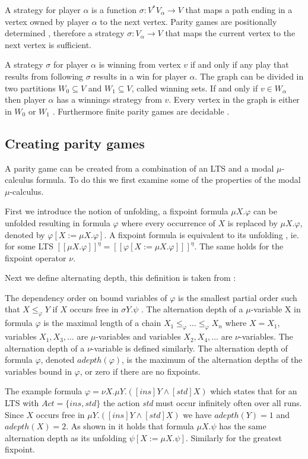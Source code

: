 A strategy for player $\alpha$ is a function $\sigma : V^*V_\alpha \rightarrow V$ that maps a path ending in a vertex owned by player $\alpha$ to the next vertex. Parity games are positionally determined \cite{Bradfield2018}, therefore a strategy $\sigma: V_\alpha \rightarrow V$ that maps the current vertex to the next vertex is sufficient. 

A strategy $\sigma$ for player $\alpha$ is winning from vertex $v$ if and only if any play that results from following $\sigma$ results in a win for player $\alpha$. The graph can be divided in two partitions $W_0 \subseteq V$ and $W_1 \subseteq V$, called winning sets. If and only if $v \in W_\alpha$ then player $\alpha$ has a winnings strategy from $v$. Every vertex in the graph is either in $W_0$ or $W_1$ \cite{Bradfield2018}. Furthermore finite parity games are decidable \cite{Bradfield2018}.


\subsection{Creating parity games}
A parity game can be created from a combination of an LTS and a modal $\mu$-calculus formula. To do this we first examine some of the properties of the modal $\mu$-calculus. 

First we introduce the notion of unfolding, a fixpoint formula $\mu X . \varphi$ can be unfolded resulting in formula $\varphi$ where every occurrence of $X$ is replaced by $\mu X . \varphi$, denoted by $\varphi [ X:= \mu X . \varphi]$. A fixpoint formula is equivalent to its unfolding \cite{Bradfield2018}, ie. for some LTS $[\![\mu X . \varphi]\!]^\eta = [\![\varphi[X:=\mu X . \varphi]]\!]^\eta$. The same holds for the fixpoint operator $\nu$.

Next we define alternating depth, this definition is taken from \cite{Bradfield2018}:
\begin{definition}
	The dependency order on bound variables of $\varphi$	is the smallest partial order such that $X \leq_\varphi Y$ if $X$ occurs free in $\sigma Y. \psi$ . The alternation depth of a $\mu$-variable X in formula $\varphi $ is the maximal length of a chain $X_1 \leq_\varphi  \dots \leq_\varphi X_n$ where $X = X_1$, variables $X_1, X_3, \dots$ are $\mu$-variables and variables $X_2, X_4, \dots$ are $\nu$-variables. The alternation depth of a $\nu$-variable is defined similarly. The alternation depth of formula $\varphi$, denoted $adepth(\varphi)$, is the maximum of the alternation depths of the variables bound in $\varphi$, or zero if there are no fixpoints.
\end{definition}
The example formula $\varphi = \nu X. \mu Y. ([ins]Y \wedge [std] X)$ which states that for an LTS with $Act = \{ ins, std\}$ the action \textit{std} must occur infinitely often over all runs. Since $X$ occurs free in $\mu Y. ([ins] Y \wedge [std]X)$ we have $adepth(Y) = 1$ and $adepth(X) = 2$. As shown in \cite{Bradfield2018} it holds that formula $\mu X. \psi$ has the same alternation depth as its unfolding $\psi[X:=\mu X. \psi]$. Similarly for the greatest fixpoint.

